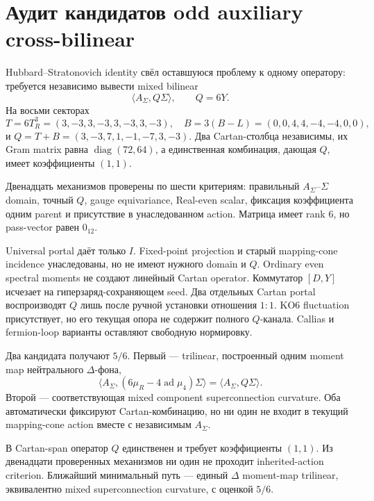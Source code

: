 \chapter{Аудит кандидатов odd auxiliary cross-bilinear}
\label{ch:v10-h15-r2-odd-auxiliary-cross-bilinear-audit}

Hubbard--Stratonovich identity свёл оставшуюся проблему к одному оператору:
требуется независимо вывести mixed bilinear
\begin{equation}
 \langle A_\Sigma,Q\Sigma\rangle,
 \qquad Q=6Y.
\end{equation}
На восьми секторах
\begin{equation}
 T=6T_R^3=(3,-3,3,-3,3,-3,3,-3),
 \quad B=3(B-L)=(0,0,4,4,-4,-4,0,0),
\end{equation}
и $Q=T+B=(3,-3,7,1,-1,-7,3,-3)$. Два Cartan-столбца независимы,
их Gram matrix равна $\operatorname{diag}(72,64)$, а единственная
комбинация, дающая $Q$, имеет коэффициенты $(1,1)$.

Двенадцать механизмов проверены по шести критериям: правильный
$A_\Sigma$--$\Sigma$ domain, точный $Q$, gauge equivariance, Real-even
scalar, фиксация коэффициента одним parent и присутствие в унаследованном
action. Матрица имеет rank $6$, но pass-vector равен $0_{12}$.

Universal portal даёт только $I$. Fixed-point projection и старый
mapping-cone incidence унаследованы, но не имеют нужного domain и $Q$.
Ordinary even spectral moments не создают линейный Cartan operator.
Коммутатор $[D,Y]$ исчезает на гиперзаряд-сохраняющем seed. Два отдельных
Cartan portal воспроизводят $Q$ лишь после ручной установки отношения
$1:1$. KO6 fluctuation присутствует, но его текущая опора не содержит
полного $Q$-канала. Callias и fermion-loop варианты оставляют свободную
нормировку.

Два кандидата получают $5/6$. Первый --- trilinear, построенный одним
moment map нейтрального $\Delta$-фона,
\begin{equation}
 \langle A_\Sigma,(6\mu_R-4\operatorname{ad}\mu_4)\Sigma\rangle
 =\langle A_\Sigma,Q\Sigma\rangle.
\end{equation}
Второй --- соответствующая mixed component superconnection curvature.
Оба автоматически фиксируют Cartan-комбинацию, но ни один не входит в
текущий mapping-cone action вместе с независимым $A_\Sigma$.

\begin{theorem}
В Cartan-span оператор $Q$ единственен и требует коэффициенты $(1,1)$.
Из двенадцати проверенных механизмов ни один не проходит inherited-action
criterion. Ближайший минимальный путь --- единый $\Delta$ moment-map
trilinear, эквивалентно mixed superconnection curvature, с оценкой $5/6$.
\end{theorem}


